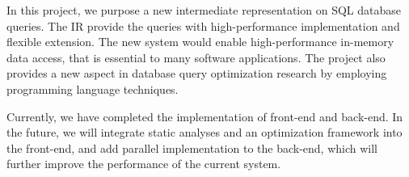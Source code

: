 \documentclass[sigplan]{acmart}
\begin{document}
In this project, we purpose a new intermediate representation on SQL database
queries. The IR provide the queries with high-performance implementation and
flexible extension. The new system would enable high-performance in-memory data
access, that is essential to many software applications. The project also provides
a new aspect in database query optimization research by employing programming
language techniques. 

Currently, we have completed the implementation of front-end and back-end. In
the future, we will integrate static analyses and an optimization framework into
the front-end, and add parallel implementation to the back-end, which will
further improve the performance of the current system. 



\end{document}
